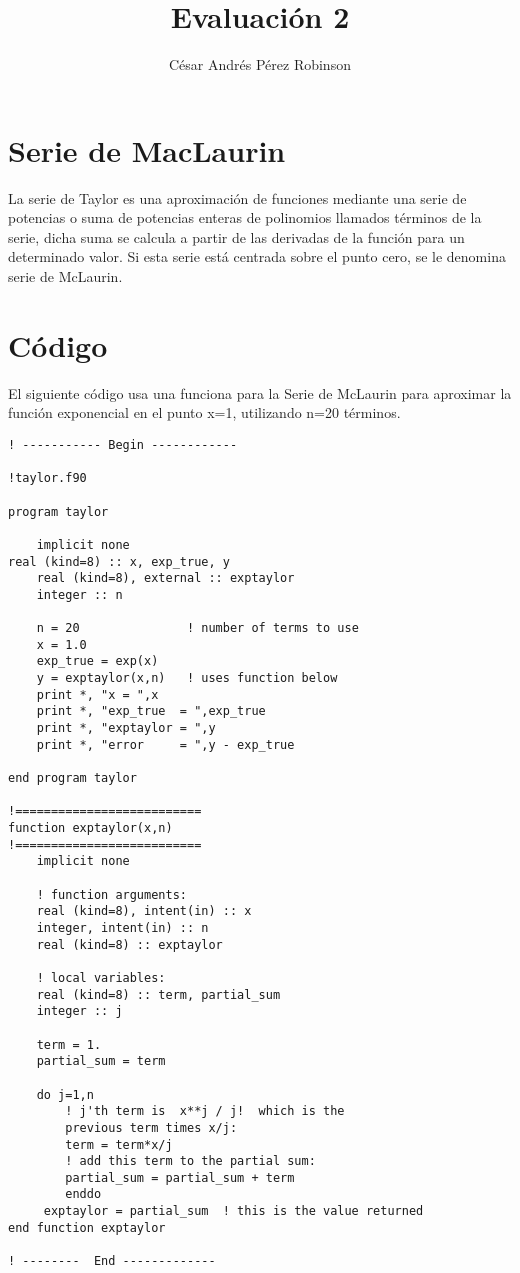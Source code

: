 \documentclass{article}
\title{Evaluación 2}
\author{César Andrés Pérez Robinson}
\begin{document}
\maketitle
\section{Serie de MacLaurin}
La serie de Taylor es una aproximación de funciones mediante una serie de potencias o suma de potencias enteras de polinomios llamados términos de la serie, dicha suma se calcula a partir de las derivadas de la función para un determinado valor. Si esta serie está centrada sobre el punto cero, se le denomina serie de McLaurin.

\section{Código}
El siguiente código usa una funciona para la Serie de McLaurin para aproximar la función exponencial en el punto x=1, utilizando n=20 términos.


\begin{verbatim}
! ----------- Begin ------------

!taylor.f90

program taylor

    implicit none                  
real (kind=8) :: x, exp_true, y
    real (kind=8), external :: exptaylor
    integer :: n

    n = 20               ! number of terms to use
    x = 1.0
    exp_true = exp(x)
    y = exptaylor(x,n)   ! uses function below
    print *, "x = ",x
    print *, "exp_true  = ",exp_true
    print *, "exptaylor = ",y
    print *, "error     = ",y - exp_true

end program taylor

!==========================
function exptaylor(x,n)
!==========================
    implicit none

    ! function arguments:
    real (kind=8), intent(in) :: x
    integer, intent(in) :: n
    real (kind=8) :: exptaylor

    ! local variables:
    real (kind=8) :: term, partial_sum
    integer :: j

    term = 1.
    partial_sum = term

    do j=1,n
        ! j'th term is  x**j / j!  which is the 
        previous term times x/j:
        term = term*x/j   
        ! add this term to the partial sum:
        partial_sum = partial_sum + term   
        enddo
     exptaylor = partial_sum  ! this is the value returned
end function exptaylor

! --------  End -------------
\end{verbatim}
\end{document}
